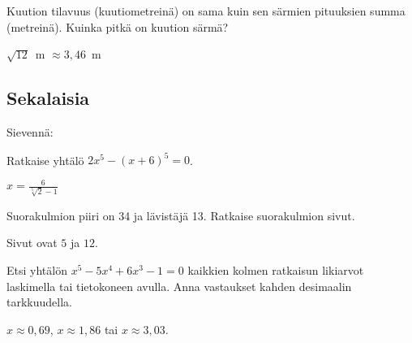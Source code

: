 \begin{tehtavasivu}
\begin{tehtava} 
Kuution tilavuus (kuutiometreinä) on sama kuin sen särmien pituuksien summa (metreinä). Kuinka pitkä on kuution särmä?
    \begin{vastaus}
		$\sqrt{12}$~m $\approx 3,46$~m
    \end{vastaus}
\end{tehtava}

\subsection*{Sekalaisia}

\begin{tehtava} 
Sievennä:
		\begin{alakohdat}
		\end{alakohdat}
	\begin{vastaus}
		\begin{alakohdat}
			\alakohta{$0$}
			\alakohta{$(x-y)^2$}
		\end{alakohdat}
    \end{vastaus}
\end{tehtava}

\begin{tehtava} 
Ratkaise yhtälö
$2x^5-(x+6)^5=0$.
    \begin{vastaus}
	$x=\frac{6}{\sqrt[5]{2}-1}$
    \end{vastaus}
\end{tehtava}

\begin{tehtava} 
Suorakulmion piiri on 34 ja lävistäjä 13. Ratkaise suorakulmion sivut.
    \begin{vastaus}
	Sivut ovat $5$ ja $12$.
    \end{vastaus}
\end{tehtava}

\begin{tehtava} %
Etsi yhtälön $x^5-5x^4+6x^3-1=0$ kaikkien kolmen ratkaisun likiarvot
laskimella tai tietokoneen avulla. Anna vastaukset
kahden desimaalin tarkkuudella.
    \begin{vastaus}
	$x \approx 0,69$, $x \approx 1,86$ tai $x \approx 3,03$.
    \end{vastaus}
\end{tehtava}


\end{tehtavasivu}

